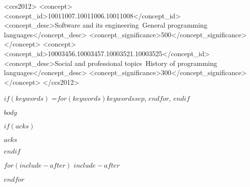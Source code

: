 \documentclass[sigplan,$if(review)$,review,anonymous$endif$]{acmart}\settopmatter{printfolios=true,printccs=false,printacmref=false}
\begin{document}
\begin{CCSXML}
<ccs2012>
<concept>
<concept_id>10011007.10011006.10011008</concept_id>
<concept_desc>Software and its engineering~General programming languages</concept_desc>
<concept_significance>500</concept_significance>
</concept>
<concept>
<concept_id>10003456.10003457.10003521.10003525</concept_id>
<concept_desc>Social and professional topics~History of programming languages</concept_desc>
<concept_significance>300</concept_significance>
</concept>
</ccs2012>
\end{CCSXML}



$if(keywords)$
\keywords={$for(keywords)$$keywords$$sep$, $endfor$},
$endif$


\maketitle


$body$


$if(acks)$
\begin{acks}                            %
$acks$
\end{acks}
$endif$



$for(include-after)$
$include-after$

$endfor$
\end{document}
